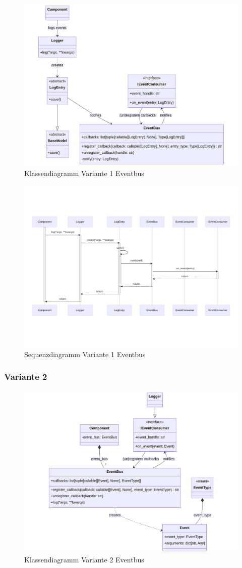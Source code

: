 \begin{figure}[!hb]
	\centering
	\includegraphics[width=0.75\linewidth]{images/diagrams/eventbus-v1-class.png}
	\caption{Klassendiagramm Variante 1 Eventbus}
	\label{fig:eventbus-v1-class}
\end{figure}

\begin{figure}[!hb]
	\centering
	\includegraphics[width=0.75\linewidth]{images/diagrams/eventbus-v1-seq.png}
	\caption{Sequenzdiagramm Variante 1 Eventbus}
	\label{fig:eventbus-v1-seq}
\end{figure}

\subsubsection*{Variante 2}

\begin{figure}[!hb]
	\centering
	\includegraphics[width=0.75\linewidth]{images/diagrams/eventbus-v2-class.png}
	\caption{Klassendiagramm Variante 2 Eventbus}
	\label{fig:eventbus-v2-class}
\end{figure}


